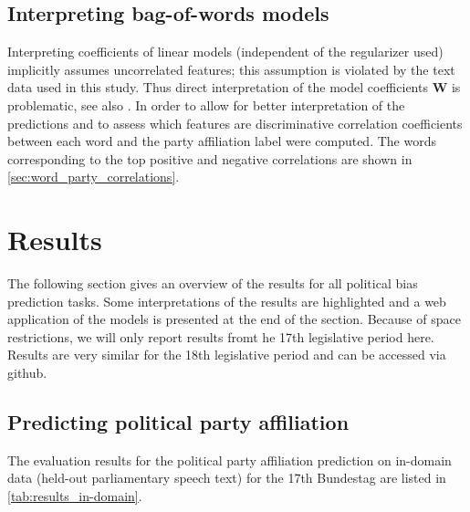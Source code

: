 \documentclass[11pt]{article}
\renewcommand{\vec}[1]{\mathbf{#1}}
\begin{document}
\subsection{Interpreting bag-of-words models}\label{sec:correlations_methods}
Interpreting coefficients of linear models (independent of the regularizer used) implicitly assumes uncorrelated features; this assumption is violated by the text data used in this study. Thus direct interpretation of the model coefficients $\vec{W}$ is problematic, see also \cite{Zien2009, Haufe2013}. In order to allow for better interpretation of the predictions and to assess which features are discriminative correlation coefficients between each word and the party affiliation label were computed. The words corresponding to the top positive and negative correlations are shown in \autoref{sec:word_party_correlations}.

\section{Results}\label{sec:results}

The following section gives an overview of the results for all political bias prediction tasks. Some interpretations of the results are highlighted and a web application of the models is presented at the end of the section. Because of space restrictions, we will only report results fromt he 17th legislative period here. Results are very similar for the 18th legislative period and can be accessed via github.

\subsection{Predicting political party affiliation}
The evaluation results for the political party affiliation prediction on in-domain data (held-out parliamentary speech text) for the 17th Bundestag are listed in \autoref{tab:results_in-domain}.
\end{document}
